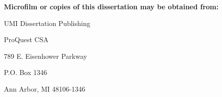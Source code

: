 \bfseries
Microfilm or copies of this dissertation may be obtained from:

\vspace{0.5cm}
UMI Dissertation Publishing

ProQuest CSA

789 E. Eisenhower Parkway

P.O. Box 1346

Ann Arbor, MI 48106-1346